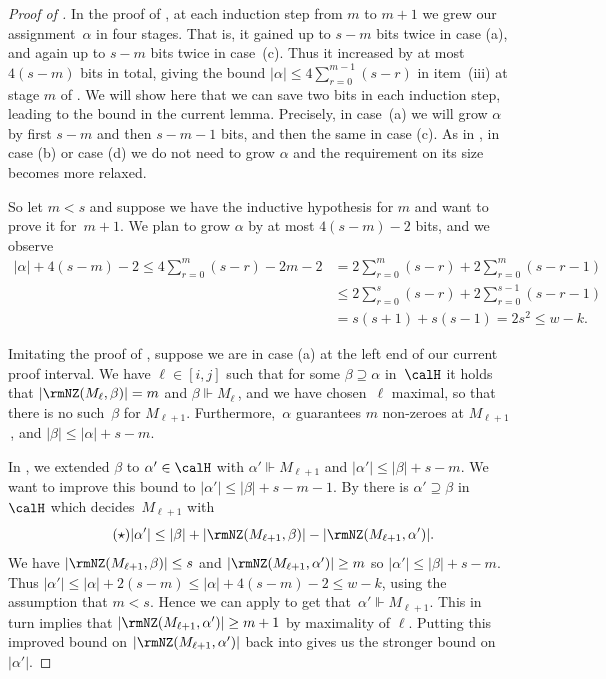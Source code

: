 \documentclass{toc}
\begin{document}
\begin{proof}[Proof of ]
In the proof of , at each
induction step from $m$ to $m+1$
we grew our assignment~$\alpha$ in four
stages. That is, it gained 
up to $s-m$ bits twice in case (a), and again  up to
 $s-m$ bits twice in case~(c). Thus it increased by at most $4(s-m)$ bits
in total, giving the bound 
$|\alpha|\le 4 \sum_{r=0}^{m-1}(s-r)$ in item~(iii)
at stage $m$
of .
We will show here that we can save two bits in each induction
step, leading to the bound in the current lemma. 
Precisely, in case~(a) we will grow $\alpha$ by first $s-m$
and then $s-m-1$ bits, and then the same in case (c).
As in , in case (b) or case (d)
we do not need to grow $\alpha$ and
the requirement on its size becomes more relaxed.

So let $m<s$ and suppose we have the inductive hypothesis
for $m$ and want to prove it for~$m+1$. We plan to grow $\alpha$
by at most $4(s-m)-2$ bits, and we observe
\begin{align*} 
|\alpha|+4(s-m)-2 
\le 4 \sum_{r=0}^{m} (s-r) -2m-2
&= 2 \sum_{r=0}^{m} (s-r) + 2 \sum_{r=0}^{m} (s-r -1) \\
&\le 2 \sum_{r=0}^{s} (s-r) + 2 \sum_{r=0}^{s-1} (s-r -1) \\
&= s(s+1) + s(s-1) = 2s^2 \le w-k.
\end{align*}



Imitating the proof of ,
suppose we are in case (a) at the left end of our current proof interval.
We have  $\ell \in [i,j]$ such that for some $\beta \supseteq \alpha$ in~$\calH$
it holds that $|\rmNZ(M_\ell, \beta)| = m$ and $\beta \Vdash M_\ell$\,,
and we have chosen~$\ell$ maximal, so that there is no such~$\beta$ for $M_{\ell+1}$. 
Furthermore,~$\alpha$ guarantees $m$ non-zeroes at $M_{\ell+1}$\,, 
and $|\beta| \le |\alpha|+s-m$.

In , we extended $\beta$ to $\alpha' \in \calH$
with $\alpha' \Vdash M_{\ell+1}$ and $|\alpha'| \le |\beta|+s-m$. 
We want  to improve this bound to $|\alpha'| \le |\beta|+s-m-1$.
By  there is $\alpha' \supseteq \beta$ in $\calH$
which decides~$M_{\ell+1}$
with 
\begin{equation} \label{eq:bound_19} \tag{$\star$}
|\alpha'| \le |\beta|+|\rmNZ(M_{\ell+1},\beta)|-|\rmNZ(M_{\ell+1}, \alpha')|.
\end{equation}
We have $|\rmNZ(M_{\ell+1}, \beta)| \le s$ and
$|\rmNZ(M_{\ell+1}, \alpha')| \ge m$ so $|\alpha'| \le |\beta|+s-m$.
Thus $|\alpha'| \le |\alpha|+2(s-m) \le |\alpha|+4(s-m)-2 \le w-k$, using the assumption that $m<s$. Hence we can apply 
to get that~$\alpha' \Vdash M_{\ell+1}$.
This in turn implies that $|\rmNZ(M_{\ell+1}, \alpha')| \ge m+1$ by 
maximality of $\ell$.
Putting this improved bound on $|\rmNZ(M_{\ell+1}, \alpha')|$ 
back into %
%
%
gives us the stronger bound on $|\alpha'|$.


\end{proof}
\end{document}
